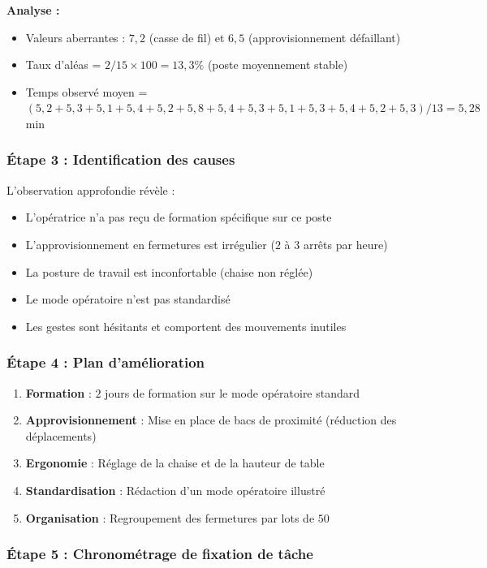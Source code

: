 \documentclass[a4paper,12pt]{article}
\begin{document}
\textbf{Analyse :}
\begin{itemize}
    \item Valeurs aberrantes : $7,2$ (casse de fil) et $6,5$ (approvisionnement défaillant)
    \item Taux d'aléas = $2/15 \times 100 = 13,3\%$ (poste moyennement stable)
    \item Temps observé moyen = $(5,2+5,3+5,1+5,4+5,2+5,8+5,4+5,3+5,1+5,3+5,4+5,2+5,3) / 13 = 5,28$ min
\end{itemize}

\subsubsection{Étape 3 : Identification des causes}

L'observation approfondie révèle :
\begin{itemize}
    \item L'opératrice n'a pas reçu de formation spécifique sur ce poste
    \item L'approvisionnement en fermetures est irrégulier ($2$ à $3$ arrêts par heure)
    \item La posture de travail est inconfortable (chaise non réglée)
    \item Le mode opératoire n'est pas standardisé
    \item Les gestes sont hésitants et comportent des mouvements inutiles
\end{itemize}

\subsubsection{Étape 4 : Plan d'amélioration}

\begin{enumerate}
    \item \textbf{Formation} : $2$ jours de formation sur le mode opératoire standard
    \item \textbf{Approvisionnement} : Mise en place de bacs de proximité (réduction des déplacements)
    \item \textbf{Ergonomie} : Réglage de la chaise et de la hauteur de table
    \item \textbf{Standardisation} : Rédaction d'un mode opératoire illustré
    \item \textbf{Organisation} : Regroupement des fermetures par lots de $50$
\end{enumerate}

\subsubsection{Étape 5 : Chronométrage de fixation de tâche}
\end{document}
